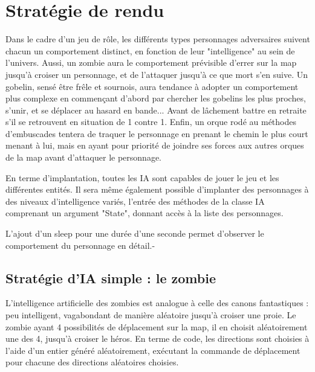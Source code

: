 \documentclass[12pt,a4paper]{report}
\begin{document}
   \section{Stratégie de rendu}
    Dans le cadre d'un jeu de rôle, les différents types personnages adversaires suivent chacun un comportement distinct, en fonction de leur "intelligence" au sein de l'univers. Aussi, un zombie aura le comportement prévisible d'errer sur la map jusqu'à croiser un personnage, et de l'attaquer jusqu'à ce que mort s'en suive. Un gobelin, sensé être frêle et sournois, aura tendance à adopter un comportement plus complexe en commençant d'abord par chercher les gobelins les plus proches, s'unir, et se déplacer au hasard en bande... Avant de lâchement battre en retraite s'il se retrouvent en situation de 1 contre 1. Enfin, un orque rodé au méthodes d'embuscades tentera de traquer le personnage en prenant le chemin le plus court menant à lui, mais en ayant pour priorité de joindre ses forces aux autres orques de la map avant d'attaquer le personnage.

En terme d'implantation, toutes les IA sont capables de jouer le jeu et les différentes entités. Il sera même également possible d'implanter des personnages à des niveaux d'intelligence variés, l'entrée des méthodes de la classe IA comprenant un argument "State", donnant accès à la liste des personnages.
   
L'ajout d'un sleep pour une durée d'une seconde permet d'observer le comportement du personnage en détail.-
   \subsection{Stratégie d'IA simple : le zombie}
   L'intelligence artificielle des zombies est analogue à celle des canons fantastiques : peu intelligent, vagabondant de manière aléatoire jusqu'à croiser une proie. Le zombie ayant 4 possibilités de déplacement sur la map, il en choisit aléatoirement une des 4, jusqu'à croiser le héros. En terme de code, les directions sont choisies à l'aide d'un entier généré aléatoirement, exécutant la commande de déplacement pour chacune des directions aléatoires choisies. 
   
\end{document}
